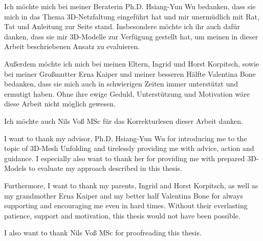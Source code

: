 \documentclass[draft,final]{vutinfth} %
\begin{document}
\frontmatter %

\addstatementpage

\begin{danksagung*}
Ich möchte mich bei meiner Beraterin Ph.D. Hsiang-Yun Wu bedanken, dass sie mich in das Thema 3D-Netzfaltung eingeführt hat und mir unermüdlich mit Rat, Tat und Anleitung zur Seite stand. Insbesondere möchte ich ihr auch dafür danken, dass sie mir 3D-Modelle zur Verfügung gestellt hat, um meinen in dieser Arbeit beschriebenen Ansatz zu evaluieren. 

Außerdem möchte ich mich bei meinen Eltern, Ingrid und Horst Korpitsch, sowie bei meiner Großmutter Erna Kaiper und meiner besseren Hälfte Valentina Bone bedanken, dass sie mich auch in schwierigen Zeiten immer unterstützt und ermutigt haben. Ohne ihre ewige Geduld, Unterstützung und Motivation wäre diese Arbeit nicht möglich gewesen.

Ich möchte auch Nils Voß MSc für das Korrekturlesen dieser Arbeit danken.
\end{danksagung*}

\begin{acknowledgements*}
I want to thank my advisor, Ph.D. Hsiang-Yun Wu for introducing me to the topic of 3D-Mesh Unfolding and tirelessly providing me with advice, action and guidance. I especially also want to thank her for providing me with prepared 3D-Models to evaluate my approach described in this thesis. 

Furthermore, I want to thank my parents, Ingrid and Horst Korpitsch, as well as my grandmother Erna Kaiper and my better half Valentina Bone for always supporting and encouraging me even in hard times. Without their everlasting patience, support and motivation, this thesis would not have been possible.

I also want to thank Nils Voß MSc for proofreading this thesis.
\end{acknowledgements*}
\end{document}
